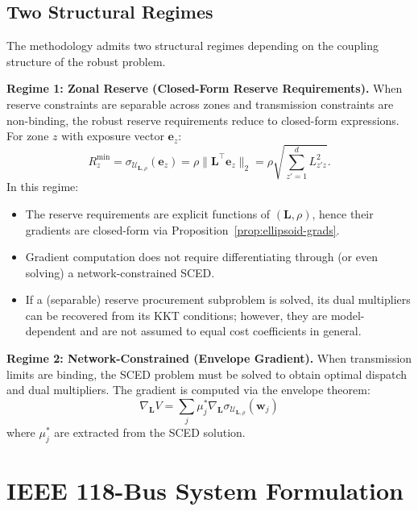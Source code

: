 \documentclass[lettersize,journal]{IEEEtran}
\newcommand{\cU}{\mathcal{U}}
\newcommand{\bw}{\bm{w}}
\newcommand{\bL}{\bm{L}}
\theoremstyle{definition}
\begin{document}
\subsection{Two Structural Regimes}

The methodology admits two structural regimes depending on the coupling structure of the robust problem.

\textbf{Regime 1: Zonal Reserve (Closed-Form Reserve Requirements).}
When reserve constraints are separable across zones and transmission constraints are non-binding,
the robust reserve requirements reduce to closed-form expressions.
For zone $z$ with exposure vector $\bm{e}_z$:
\begin{equation}
R_z^{\min}=\sigma_{\cU_{\bL,\rho}}(\bm{e}_z)=\rho\|\bL^\top \bm{e}_z\|_2
=\rho\sqrt{\sum_{z'=1}^d L_{z'z}^2}.
\end{equation}
In this regime:
\begin{itemize}
\item The reserve requirements are explicit functions of $(\bL,\rho)$, hence their gradients are closed-form via Proposition~\ref{prop:ellipsoid-grads}.
\item Gradient computation does not require differentiating through (or even solving) a network-constrained SCED.
\item If a (separable) reserve procurement subproblem is solved, its dual multipliers can be recovered from its KKT conditions; however, they are model-dependent and are not assumed to equal cost coefficients in general.
\end{itemize}

\textbf{Regime 2: Network-Constrained (Envelope Gradient).} When transmission limits are binding, the SCED problem must be solved to obtain optimal dispatch and dual multipliers. The gradient is computed via the envelope theorem:
\begin{equation}
\nabla_{\bL} V = \sum_j \mu_j^* \nabla_{\bL} \sigma_{\cU_{\bL,\rho}}(\bw_j)
\end{equation}
where $\mu_j^*$ are extracted from the SCED solution.

\section{IEEE 118-Bus System Formulation}
\label{sec:case-study}
\end{document}
